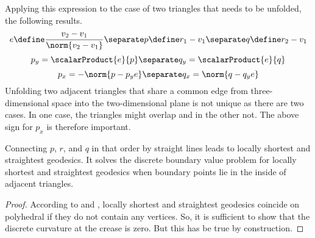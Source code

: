 \documentclass{stdlocal}
\begin{document}
Applying this expression to the case of two triangles that needs to be unfolded, the following results.
\[
  e \define \frac{v_2 - v_1}{\norm{v_2 - v_1}}
  \separate
  p \define r_1 - v_1
  \separate
  q \define r_2 - v_1
\]
\[
  p_y = \scalarProduct{e}{p}
  \separate
  q_y = \scalarProduct{e}{q}
\]
\[
  p_x = -\norm{p - p_y e}
  \separate
  q_x = \norm{q - q_y e}
\]
Unfolding two adjacent triangles that share a common edge from three-dimensional space into the two-dimensional plane is not unique as there are two cases.
In one case, the triangles might overlap and in the other not.
The above sign for $p_x$ is therefore important.

\begin{lemma}
  Connecting $p$, $r$, and $q$ in that order by straight lines leads to locally shortest and straightest geodesics.
  It solves the discrete boundary value problem for locally shortest and straightest geodesics when boundary points lie in the inside of adjacent triangles.
\end{lemma}
\begin{proof}
  According to \textcite{polthier2006} and \textcite{martinez2005}, locally shortest and straightest geodesics coincide on polyhedral if they do not contain any vertices.
  So, it is sufficient to show that the discrete curvature at the crease is zero.
  But this has be true by construction.
\end{proof}
\end{document}
